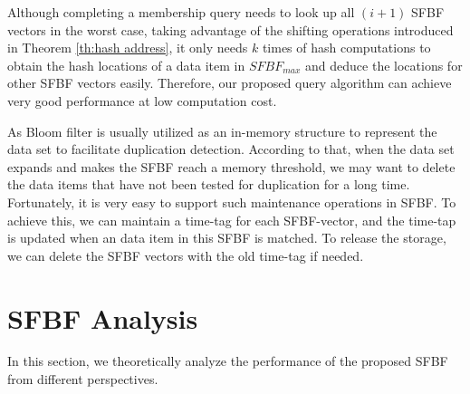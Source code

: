 \documentclass[10pt,journal,letterpaper]{IEEEtran}
\begin{document}

Although completing a membership query needs to look up all $(i+1)$ SFBF vectors in the worst case, taking advantage of the shifting operations introduced in Theorem \ref{th:hash address}, it only needs $k$ times of hash computations to obtain the hash locations of a data item in $SFBF_{max}$ and deduce the locations for other SFBF vectors easily. Therefore, our proposed query algorithm can achieve very good performance at low computation cost.


As Bloom filter is usually utilized as an in-memory structure to represent the  data set to facilitate duplication detection. According to that,  when the data set expands and makes the SFBF reach a memory threshold, we may want to delete the data items that have not been tested for duplication for a long time. Fortunately, it is very easy to support such maintenance operations in SFBF. To achieve this, we can maintain a time-tag for each SFBF-vector, and the time-tap is updated when an data item in this SFBF is matched. To release the storage, we can delete the SFBF vectors with the old time-tag if needed.

%
\section{SFBF Analysis}
\label{sec:SFBF Analysis}

In this section, we theoretically analyze the performance of the proposed SFBF from different perspectives.
\end{document}
